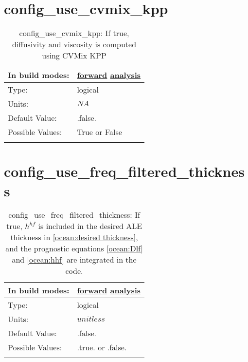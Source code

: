 \section[config\_use\_cvmix\_kpp]{config\_use\_cvmix\_kpp}
\label{sec:nm_sec_config_use_cvmix_kpp}
\begin{center}
\begin{longtable}{| p{2.0in} || p{4.0in} |}
    \hline
    In build modes: & \hyperref[subsec:forward_nm_tab_cvmix]{forward} \hyperref[subsec:analysis_nm_tab_cvmix]{analysis} \\
    \hline
    Type: & logical \\
    \hline
    Units: & $NA$ \\
    \hline
    Default Value: & .false. \\
    \hline
    Possible Values: & True or False \\
    \hline
    \caption{config\_use\_cvmix\_kpp: If true, diffusivity and viscosity is computed using CVMix KPP}
\end{longtable}
\end{center}
\section[config\_use\_freq\_filtered\_thickness]{config\_use\_freq\_filtered\_thickness}
\label{sec:nm_sec_config_use_freq_filtered_thickness}
\begin{center}
\begin{longtable}{| p{2.0in} || p{4.0in} |}
    \hline
    In build modes: & \hyperref[subsec:forward_nm_tab_ALE_frequency_filtered_thickness]{forward} \hyperref[subsec:analysis_nm_tab_ALE_frequency_filtered_thickness]{analysis} \\
    \hline
    Type: & logical \\
    \hline
    Units: & $unitless$ \\
    \hline
    Default Value: & .false. \\
    \hline
    Possible Values: & .true. or .false. \\
    \hline
    \caption{config\_use\_freq\_filtered\_thickness:  If true,  $h^{hf}$  is included in the desired ALE thickness in \ref{ocean:desired thickness}, and the prognostic equations \ref{ocean:Dlf} and \ref{ocean:hhf} are integrated in the code.}
\end{longtable}
\end{center}
